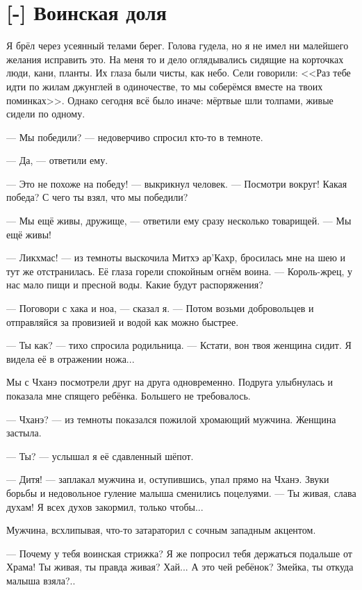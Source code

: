 \section{[-] Воинская доля}

Я брёл через усеянный телами берег.
Голова гудела, но я не имел ни малейшего желания исправить это.
На меня то и дело оглядывались сидящие на корточках люди, кани, планты.
Их глаза были чисты, как небо.
Сели говорили: <<Раз тебе идти по жилам джунглей в одиночестве, то мы соберёмся вместе на твоих поминках>>.
Однако сегодня всё было иначе: мёртвые шли толпами, живые сидели по одному.

--- Мы победили? --- недоверчиво спросил кто-то в темноте.

--- Да, --- ответили ему.

--- Это не похоже на победу! --- выкрикнул человек.
--- Посмотри вокруг!
Какая победа?
С чего ты взял, что мы победили?

--- Мы ещё живы, дружище, --- ответили ему сразу несколько товарищей.
--- Мы ещё живы!

--- Ликхмас! --- из темноты выскочила Митхэ ар'Кахр, бросилась мне на шею и тут же отстранилась.
Её глаза горели спокойным огнём воина.
--- Король-жрец, у нас мало пищи и пресной воды.
Какие будут распоряжения?

--- Поговори с хака и ноа, --- сказал я.
--- Потом возьми добровольцев и отправляйся за провизией и водой как можно быстрее.

--- Ты как? --- тихо спросила родильница.
--- Кстати, вон твоя женщина сидит.
Я видела её в отражении ножа...

Мы с Чханэ посмотрели друг на друга одновременно.
Подруга улыбнулась и показала мне спящего ребёнка.
Большего не требовалось.

--- Чханэ? --- из темноты показался пожилой хромающий мужчина.
Женщина застыла.

--- Ты? --- услышал я её сдавленный шёпот.

--- Дитя! --- заплакал мужчина и, оступившись, упал прямо на Чханэ.
Звуки борьбы и недовольное гуление малыша сменились поцелуями.
--- Ты живая, слава духам!
Я всех духов закормил, только чтобы...

Мужчина, всхлипывая, что-то затараторил с сочным западным акцентом.

--- Почему у тебя воинская стрижка?
Я же попросил тебя держаться подальше от Храма!
Ты живая, ты правда живая?
Хай...
А это чей ребёнок?
Змейка, ты откуда малыша взяла?..

